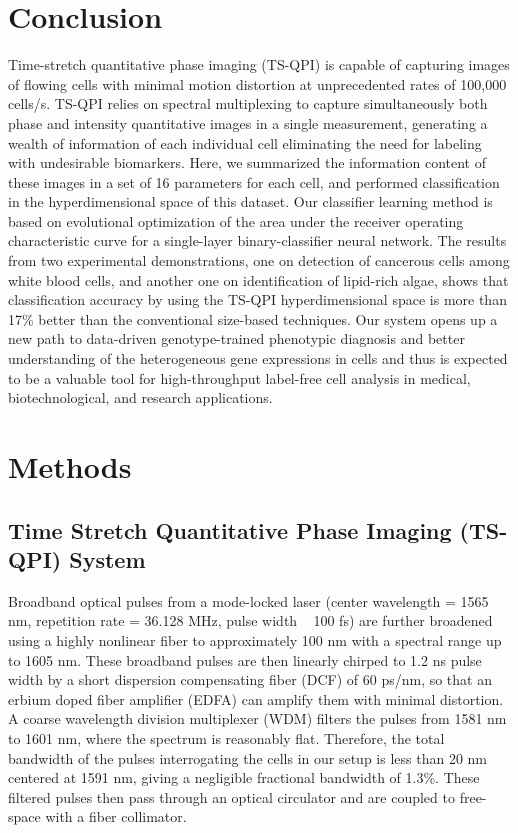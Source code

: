 \documentclass[aps,pra,reprint,longbibliography,superscriptaddress]{revtex4-1}
\begin{document}
\section{Conclusion}

Time-stretch quantitative phase imaging (TS-QPI) is capable of capturing images of flowing cells with minimal motion distortion at unprecedented rates of 100,000 cells/s. TS-QPI relies on spectral multiplexing to capture simultaneously both phase and intensity quantitative images in a single measurement, generating a wealth of information of each individual cell eliminating the need for labeling with undesirable biomarkers. Here, we summarized the information content of these images in a set of 16 parameters for each cell, and performed classification in the hyperdimensional space of this dataset. Our classifier learning method is based on evolutional optimization of the area under the receiver operating characteristic curve for a single-layer binary-classifier neural network. The results from two experimental demonstrations, one on detection of cancerous cells among white blood cells, and another one on identification of lipid-rich algae, shows that classification accuracy by using the TS-QPI hyperdimensional space is more than 17\% better than the conventional size-based techniques.
Our system opens up a new path to data-driven genotype-trained phenotypic diagnosis and better understanding of the heterogeneous gene expressions in cells and thus is expected to be a valuable tool for high-throughput label-free cell analysis in medical, biotechnological, and research applications.

\section{\label{scn:Methods} Methods}

\subsection{Time Stretch Quantitative Phase Imaging (TS-QPI) System}

Broadband optical pulses from a mode-locked laser (center wavelength = 1565 nm, repetition rate = 36.128 MHz, pulse width ~ 100 fs) are further broadened using a highly nonlinear fiber to approximately 100 nm with a spectral range up to 1605 nm. These broadband pulses are then linearly chirped to 1.2 ns pulse width by a short dispersion compensating fiber (DCF) of 60 ps/nm, so that an erbium doped fiber amplifier (EDFA) can amplify them with minimal distortion. A coarse wavelength division multiplexer (WDM) filters the pulses from 1581 nm to 1601 nm, where the spectrum is reasonably flat. Therefore, the total bandwidth of the pulses interrogating the cells in our setup is less than 20 nm centered at 1591 nm, giving a negligible fractional bandwidth of 1.3\%. These filtered pulses then pass through an optical circulator and are coupled to free-space with a fiber collimator.
\end{document}

